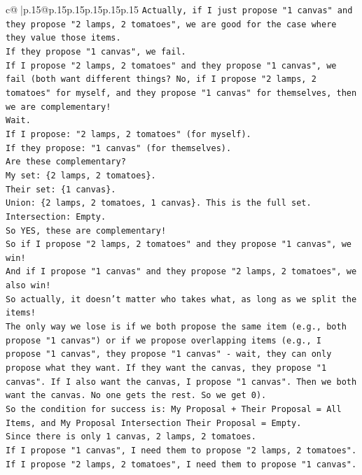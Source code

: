 \documentclass{article}
\begin{document}
{\begin{supertabular}{c@{$\;$}|p{.15\linewidth}@{}p{.15\linewidth}p{.15\linewidth}p{.15\linewidth}p{.15\linewidth}p{.15\linewidth}}
{{{\texttt{Actually, if I just propose "1 canvas" and they propose "2 lamps, 2 tomatoes", we are good for the case where they value those items.} \\
\texttt{If they propose "1 canvas", we fail.} \\
\texttt{If I propose "2 lamps, 2 tomatoes" and they propose "1 canvas", we fail (both want different things? No, if I propose "2 lamps, 2 tomatoes" for myself, and they propose "1 canvas" for themselves, then we are complementary!} \\
\texttt{Wait.} \\
\texttt{If I propose: "2 lamps, 2 tomatoes" (for myself).} \\
\texttt{If they propose: "1 canvas" (for themselves).} \\
\texttt{Are these complementary?} \\
\texttt{My set: \{2 lamps, 2 tomatoes\}.} \\
\texttt{Their set: \{1 canvas\}.} \\
\texttt{Union: \{2 lamps, 2 tomatoes, 1 canvas\}. This is the full set.} \\
\texttt{Intersection: Empty.} \\
\texttt{So YES, these are complementary!} \\
\texttt{So if I propose "2 lamps, 2 tomatoes" and they propose "1 canvas", we win!} \\
\texttt{And if I propose "1 canvas" and they propose "2 lamps, 2 tomatoes", we also win!} \\
\texttt{So actually, it doesn't matter who takes what, as long as we split the items!} \\
\texttt{The only way we lose is if we both propose the same item (e.g., both propose "1 canvas") or if we propose overlapping items (e.g., I propose "1 canvas", they propose "1 canvas" {-} wait, they can only propose what they want. If they want the canvas, they propose "1 canvas". If I also want the canvas, I propose "1 canvas". Then we both want the canvas. No one gets the rest. So we get 0).} \\
\texttt{So the condition for success is: My Proposal + Their Proposal = All Items, and My Proposal Intersection Their Proposal = Empty.} \\
\texttt{Since there is only 1 canvas, 2 lamps, 2 tomatoes.} \\
\texttt{If I propose "1 canvas", I need them to propose "2 lamps, 2 tomatoes".} \\
\texttt{If I propose "2 lamps, 2 tomatoes", I need them to propose "1 canvas".} \\
}}}
\end{supertabular}}
\end{document}
